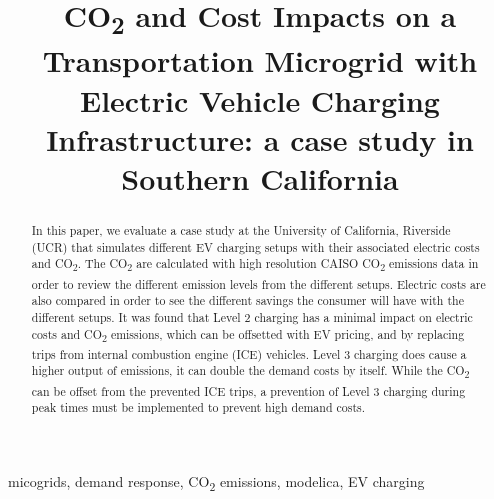 \documentclass[conference]{IEEEtran}
\begin{document}
\title{CO\textsubscript{2} and Cost Impacts on a Transportation Microgrid with Electric Vehicle Charging Infrastructure: a case study in Southern California}

\author{
}
\maketitle

\begin{abstract}

	In this paper, we evaluate a case study at the University of California, Riverside (UCR) that simulates different EV charging setups with their associated electric costs and CO\textsubscript{2}. The CO\textsubscript{2} are calculated with high resolution CAISO CO\textsubscript{2} emissions data in order to review the different emission levels from the different setups. Electric costs are also compared in order to see the different savings the consumer will have with the different setups. It was found that Level 2 charging has a minimal impact on electric costs and CO\textsubscript{2} emissions, which can be offsetted with EV pricing, and by replacing trips from internal combustion engine (ICE) vehicles. Level 3 charging does cause a higher output of emissions, it can double the demand costs by itself. While the CO\textsubscript{2} can be offset from the prevented ICE trips, a prevention of Level 3 charging during peak times must be implemented to prevent high demand costs.
	

\end{abstract}

\begin{IEEEkeywords}
micogrids, demand response, CO\textsubscript{2} emissions, modelica, EV charging
\end{IEEEkeywords}
\end{document}
